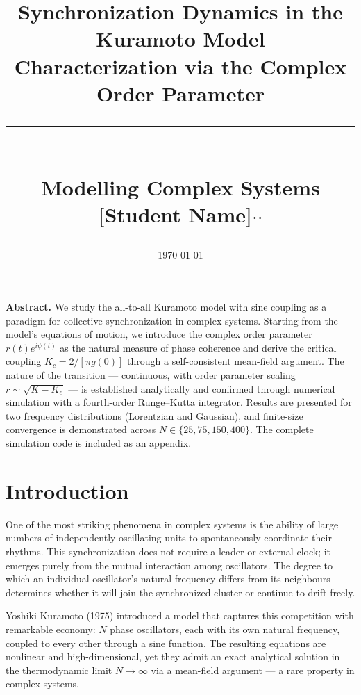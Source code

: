 \documentclass[12pt,a4paper]{article}
\title{
  \vspace{-0.9cm}
  {\LARGE\bfseries Synchronization Dynamics in the Kuramoto Model}\\[0.3em]
  {\large Characterization via the Complex Order Parameter}\\[0.7em]
  \rule{0.82\linewidth}{0.5pt}\\[0.4em]
  {\normalsize Modelling Complex Systems}\\[0.25em]
  {\normalsize [Student Name]\quad$\cdot$\quad[ID]\quad$\cdot$\quad[Department / University]}
}
\date{\today}
\begin{document}
\maketitle
\thispagestyle{fancy}

\begin{mdframed}[style=keybox]
\noindent\textbf{Abstract.}\;
We study the all-to-all Kuramoto model with sine coupling as a paradigm
for collective synchronization in complex systems.
Starting from the model's equations of motion, we introduce the complex
order parameter $r(t)e^{i\psi(t)}$ as the natural measure of phase coherence
and derive the critical coupling $K_c = 2/[\pi g(0)]$ through a
self-consistent mean-field argument.
The nature of the transition — continuous, with order parameter
scaling $r \sim \sqrt{K-K_c}$ — is established analytically and confirmed
through numerical simulation with a fourth-order Runge--Kutta integrator.
Results are presented for two frequency distributions (Lorentzian and
Gaussian), and finite-size convergence is demonstrated across
$N \in \{25, 75, 150, 400\}$.
The complete simulation code is included as an appendix.
\end{mdframed}

\tableofcontents
\newpage

\section{Introduction}
\label{sec:intro}

One of the most striking phenomena in complex systems is the ability of
large numbers of independently oscillating units to spontaneously
coordinate their rhythms.
This synchronization does not require a leader or external clock; it
emerges purely from the mutual interaction among oscillators.
The degree to which an individual oscillator's natural frequency differs
from its neighbours determines whether it will join the synchronized
cluster or continue to drift freely.

Yoshiki Kuramoto (1975) introduced a model that captures this competition
with remarkable economy: $N$ phase oscillators, each with its own natural
frequency, coupled to every other through a sine function.
The resulting equations are nonlinear and high-dimensional, yet they
admit an exact analytical solution in the thermodynamic limit
$N \to \infty$ via a mean-field argument — a rare property in complex
systems.
\end{document}
